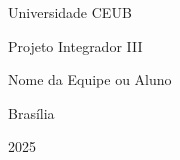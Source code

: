 
\begin{titlepage}
    \centering
    \vspace*{5cm}
    {\Large Universidade CEUB \par}
    {\large Projeto Integrador III \par}
    \vfill
    {\large Nome da Equipe ou Aluno \par}
    {\large Brasília \par}
    {\large 2025 \par}
\end{titlepage}
